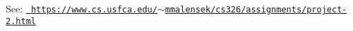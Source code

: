 See\+: \href{https://www.cs.usfca.edu/~mmalensek/cs326/assignments/project-2.html}{\texttt{ https\+://www.\+cs.\+usfca.\+edu/$\sim$mmalensek/cs326/assignments/project-\/2.\+html}} 